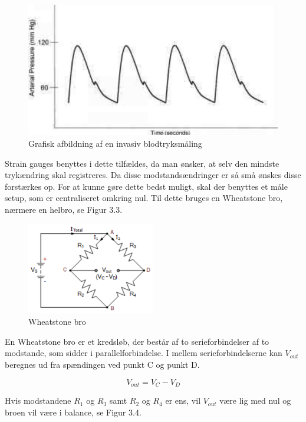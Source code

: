 \begin{figure}[H]
	\centering
	\includegraphics[width=1\textwidth]{Figurer/Snip20151207_51}
	\caption{Grafisk afbildning af en invasiv blodtryksmåling}
\end{figure}

Strain gauges benyttes i dette tilfældes, da man ønsker, at selv den mindste trykændring skal registreres. Da disse modstandsændringer er så små ønskes disse forstærkes op. For at kunne gøre dette bedst muligt, skal der benyttes et måle setup, som er centraliseret omkring nul. Til dette bruges en Wheatstone bro, nærmere en helbro, se Figur 3.3. 

\begin{figure}[H]
	\centering
	\includegraphics[width=0.5\textwidth]{Figurer/Snip20151207_63}
	\caption{Wheatstone bro}
\end{figure}

En Wheatstone bro er et kredsløb, der består af to serieforbindelser af to modstande, som sidder i parallelforbindelse. I mellem serieforbindelserne kan $V_{out}$ beregnes ud fra spændingen ved punkt C og punkt D.

\begin{equation}
	V_{out} = V_{C} - V_{D}
\end{equation} 

Hvis modstandene $R_{1}$ og $R_{3}$ samt $R_{2}$ og $R_{4}$ er ens, vil $V_{out}$ være lig med nul og broen vil være i balance, se Figur 3.4. 

